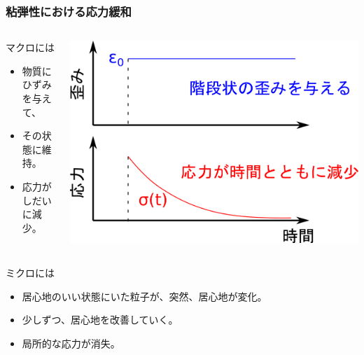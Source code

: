 \documentclass[12pt, dvipdfmx]{beamer}
\begin{document}
\begin{frame}
	\frametitle{粘弾性における応力緩和}
		\begin{columns}[T, onlytextwidth]
				\begin{block}{マクロには}
					\begin{itemize}
						\item 物質にひずみを与えて、
						\item その状態に維持。
						\item 応力がしだいに減少。
					\end{itemize}
				\end{block}
			\includegraphics[width=\textwidth]{stress_relux.png}
		\end{columns}
		
		\begin{exampleblock}{ミクロには}
			\begin{itemize}
				\item 居心地のいい状態にいた粒子が、突然、居心地が変化。
				\item 少しずつ、\alert{居心地を改善}していく。
				\item 局所的な応力が消失。
			\end{itemize}
		\end{exampleblock}
\end{frame}
\end{document}

